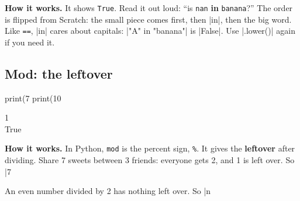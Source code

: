 \textbf{How it works.} It shows \texttt{True}. Read it out loud: ``is \texttt{nan} \textbf{in} \texttt{banana}?'' The order is flipped from Scratch: the small piece comes first, then \py|in|, then the big word. Like \texttt{==}, \py|in| cares about capitals: \py|"A" in "banana"| is \py|False|. Use \py|.lower()| again if you need it.

\subsection*{Mod: the leftover}

\begin{tcbraster}[raster columns=2, raster equal height=rows, raster column skip=12pt, raster valign=center, raster force size=false, raster odd column/.style={add to width=-1.2cm}, raster even column/.style={add to width=1.2cm}]
\begin{tcolorbox}[colback=white, colframe=white, boxrule=0pt, valign=center]
\begin{scratch}
\end{scratch}
\end{tcolorbox}
\begin{tcolorbox}[colback=white, colframe=white, boxrule=0pt, left=0pt, right=0pt, top=0pt, bottom=0pt, valign=center]
\begin{code}
print(7 %
print(10 %
\end{code}
\begin{outputbox}
1\\
True
\end{outputbox}
\end{tcolorbox}
\end{tcbraster}

\textbf{How it works.} In Python, \texttt{mod} is the percent sign, \texttt{\%}. It gives the \textbf{leftover} after dividing. Share 7 sweets between 3 friends: everyone gets 2, and 1 is left over. So \py|7 %

\begin{think}
An even number divided by 2 has nothing left over. So \py|n %
\end{think}

